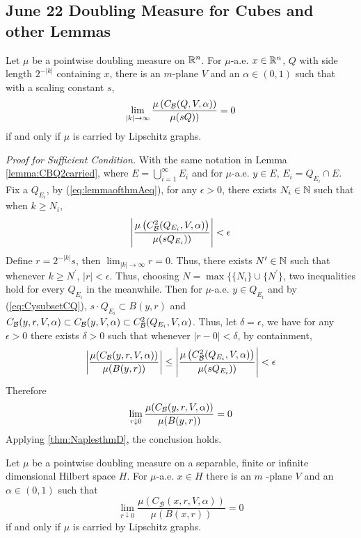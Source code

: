 \newpage
\subsection{June 22 Doubling Measure for Cubes and other Lemmas}

\begin{lemma}\label{lemma:ofthmA} 
    Let $\mu$ be a pointwise doubling measure on $\mathbb{R}^n$. For $\mu$-a.e. $x \in \mathbb{R}^n$, $Q$ with side length $2^{-|k|}$ containing $x$, there is an $m$-plane $V$ and an $\alpha \in(0,1)$ such that with a scaling constant $s$,
    \begin{equation}\label{eq:lemmaofthmAeq}
        \lim_{|k| \rightarrow \infty} \frac{\mu\left(C_\mathcal B(Q, V, \alpha)\right)}{\mu(sQ))}=0
    \end{equation}
    if and only if $\mu$ is carried by Lipschitz graphs.
\end{lemma}
\textit{Proof for Sufficient Condition.} With the same notation in Lemma \ref{lemma:CBQ2carried}, where $E = \bigcup_{i=1}^\infty E_i$ and for $\mu$-a.e. $y\in E$, $E_i = Q_{E_i}\cap E$. Fix a $Q_{E_i}$, by (\ref{eq:lemmaofthmAeq}), for any $\epsilon>0$, there exists $N_i\in\mathbb{N}$ such that when $k\geq N_i$, 
$$\left |\frac{\mu\left(C_\mathcal B^2(Q_{E_i}, V, \alpha)\right)}{\mu(sQ_{E_i}))}\right | < \epsilon$$
Define $r = 2^{-|k|}s$, then $\lim_{|k|\rightarrow\infty} r = 0$. Thus, there exists $N^\prime\in \mathbb{N}$ such that whenever $k\geq N^\prime$, $|r|<\epsilon$. Thus, choosing $N=\max\{\{N_i\}\cup\{N^\prime\}$, two inequalities hold for every $Q_{E_i}$ in the meanwhile. Then for $\mu$-a.e. $y\in Q_{E_i}$ and by (\ref{eq:CysubsetCQ}), $s\cdot Q_{E_i}\subset B(y, r)$ and $C_\mathcal B(y, r, V, \alpha)\subset C_\mathcal B(y, V, \alpha)\subset C_\mathcal B^2(Q_{E_i}, V, \alpha)$. Thus, let $\delta = \epsilon$, we have for any $\epsilon>0$ there exists $\delta>0$ such that whenever $|r-0|<\delta$, by containment, 
\begin{equation}
    \left|  \frac{\mu(C_\mathcal B(y, r, V, \alpha))}{\mu(B(y, r))} \right| \leq \left |\frac{\mu\left(C_\mathcal B^2(Q_{E_i}, V, \alpha)\right)}{\mu(sQ_{E_i}))}\right| < \epsilon
\end{equation}
Therefore
\begin{equation}\label{eq:lemmathmAeq2}
    \lim_{r\downarrow 0} \frac{\mu(C_\mathcal B(y, r, V, \alpha))}{\mu(B(y, r))} = 0
\end{equation}
Applying \ref{thm:NaplesthmD}, the conclusion holds.


\begin{customthm}{{\cite[Theorem D]{naples2020}}}\label{thm:NaplesthmD}
    Let $\mu$ be a pointwise doubling measure on a separable, finite or infinite dimensional Hilbert space $H$. For $\mu$-a.e. $x \in H$ there is an $m$ -plane $V$ and an $\alpha \in(0,1)$ such that
$$
\lim _{r \downarrow 0} \frac{\mu\left(C_{\mathcal{B}}(x, r, V, \alpha)\right)}{\mu(B(x, r))}=0
$$
if and only if $\mu$ is carried by Lipschitz graphs.
\end{customthm}




